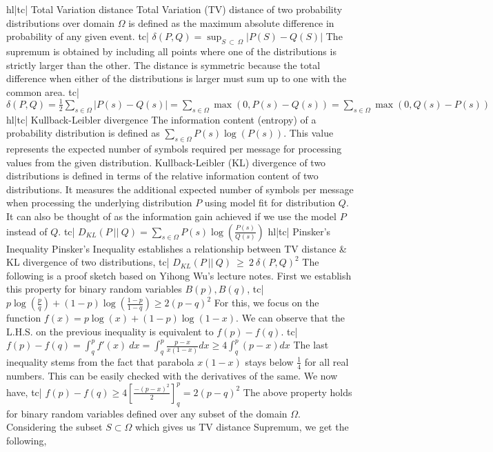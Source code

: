 hl|tc| Total Variation distance
Total Variation (TV) distance of two probability distributions over domain \(\Omega\) is defined as the maximum absolute difference in probability of any given event.
tc| \( \delta(P, Q) = \sup_{S \ \subset \ \Omega} | P(S) - Q(S) | \)
The supremum is obtained by including all points where one of the distributions is strictly larger than the other. The distance is symmetric because the total difference when either of the distributions is larger must sum up to one with the common area.
tc| \( \delta(P, Q) = \frac{1}{2} \sum_{s \in \Omega} |P(s) - Q(s)| = \sum_{s \in \Omega} \max(0, P(s) - Q(s)) = \sum_{s \in \Omega} \max(0, Q(s) - P(s)) \)
hl|tc| Kullback-Leibler divergence
The information content (entropy) of a probability distribution is defined as \( \sum_{s \in \Omega} P(s) \log(P(s)) \). This value represents the expected number of symbols required per message for processing values from the given distribution.
Kullback-Leibler (KL) divergence of two distributions is defined in terms of the relative information content of two distributions. It measures the additional expected number of symbols per message when processing the underlying distribution \(P\) using model fit for distribution \(Q\). It can also be thought of as the information gain achieved if we use the model \(P\) instead of \(Q\).
tc| \( D_{KL} (P \ || \ Q) = \sum_{s \in \Omega} P(s) \log \left(\frac{P(s)}{Q(s)}\right) \)
hl|tc| Pinsker's Inequality
Pinsker's Inequality establishes a relationship between TV distance & KL divergence of two distributions,
tc| \( D_{KL} (P \ || \ Q) \ \ge \ 2 \ \delta(P, Q)^2 \)
The following is a proof sketch based on Yihong Wu's lecture notes. First we establish this property for binary random variables \( B(p), B(q) \),
tc| \( p \log{ \left( \frac{p}{q} \right) } + (1-p) \log{ \left( \frac{1-p}{1-q} \right) \ge 2(p-q)^2 } \)
For this, we focus on the function \( f(x) = p \log (x) + (1 - p) \log (1 - x) \). We can observe that the L.H.S. on the previous inequality is equivalent to \( f(p) - f(q) \).
tc| \( f(p) - f(q) = \int_q^p f'(x) \ dx = \int_q^p \frac{p - x}{x (1 - x)} dx \ge 4 \int_q^p (p - x) dx \)
The last inequality stems from the fact that parabola \( x (1-x) \) stays below \( \frac{1}{4} \) for all real numbers. This can be easily checked with the derivatives of the same. We now have,
tc| \( f(p) - f(q) \ge 4 \left[ \frac{-(p-x)^2}{2} \right]_q^p = 2 (p - q)^2 \)
The above property holds for binary random variables defined over any subset of the domain \( \Omega \). Considering the subset \( S \subset \Omega \) which gives us TV distance Supremum, we get the following,
